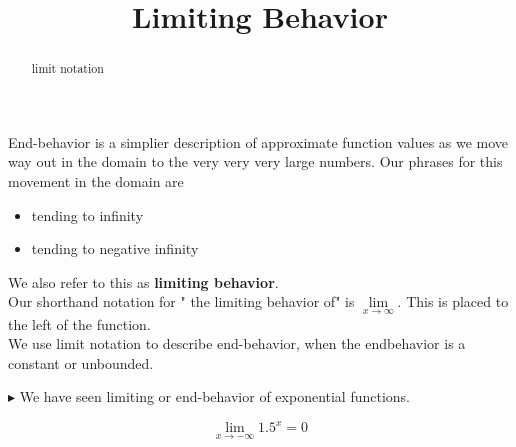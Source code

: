 \documentclass{ximera}
\title{Limiting Behavior}
\begin{document}
\begin{abstract}
limit notation
\end{abstract}
\maketitle




End-behavior is a simplier description of approximate function values as we move way out in the domain to the very very very large numbers.  Our phrases for this movement in the domain are 

\begin{itemize}
\item tending to infinity
\item tending to negative infinity
\end{itemize}


We also refer to this as \textbf{limiting behavior}. \\


Our shorthand notation for " the limiting behavior of" is $\lim\limits_{x \to \infty}$.  This is placed to the left of the function. \\






We use limit notation to describe end-behavior, when the endbehavior is a constant or unbounded.






$\blacktriangleright$  We have seen limiting or end-behavior of exponential functions.


\[   \lim_{x \to -\infty} 1.5^x   = 0      \]


\begin{image}
\end{image}
\end{document}

